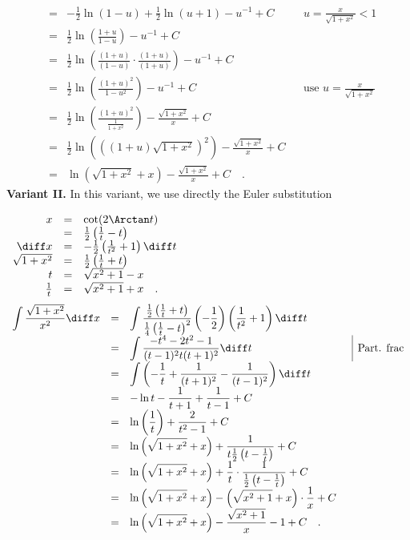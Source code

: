 {\[\begin{array}{rcll|l}
&=&\displaystyle  -\frac{1}{2} \ln{}\left(1-u\right)+ \frac{ 1}{2} \ln{}\left(u+1\right)- u^{-1}   +C&& u=\frac{x}{\sqrt{1+x^2}}<1\\
&=&\displaystyle \frac{1}{2} \ln\left(\frac{1+u}{1-u} \right) - u^{-1}+C  \\
&=&\displaystyle \frac{1}{2} \ln\left(\frac{(1+u)}{(1-u)} \cdot \frac{(1+u)}{(1+u)} \right) - u^{-1}+C  \\
&=&\displaystyle \frac{1}{2} \ln \left( \frac{(1+u)^2}{1-u^2 }\right) - u^{-1}+C&&\text{use }u=\frac{x}{\sqrt{1+x^2}}\\
&=&\displaystyle \frac{1}{2}\ln \left( \frac{ (1+u)^2 }{ \frac{ 1}{1+x^2}} \right)-\frac{\sqrt{1+x^2}}{x}+C\\
&=&\displaystyle \frac{1}{2} \ln \left( \left((1+ u) \sqrt{1 + x^2} \right)^2\right)-\frac{\sqrt{1+x^2}}{x}+C\\
&=&\displaystyle \ln \left(\sqrt{1+x^2}+x \right)-\frac{\sqrt{1+x^2}}{x}+C\quad .
\end{array}
\]
\textbf{Variant II. } In this variant, we use directly the Euler substitution 

$\begin{array}{rcl}
x&=&\cot (2\Arctan t)\\
&=& \frac{1 }{2} \left( \frac{ 1}{t}-t\right)\\ 
\diff x &=&-\frac{1}{2}\left(\frac{1}{t^2}+1\right) \diff t \\
\sqrt{1+x^2}&=&\frac{1}{2}\left(\frac{1}{t}+t\right)\\
t&=&\sqrt{x^2+1}-x\\
\frac{1}{t}&=&\sqrt{x^2+1}+x\quad .
\end{array}
$
\[
\begin{array}{rcll|l}
\displaystyle \int \frac{\sqrt{1+x^2}}{x^2}\diff x&=&\displaystyle \int \frac{ \frac{1}{2} \left( \frac{1}{t}+t\right) }{\frac{1}{4}\left(\frac{1}{t}-t\right)^2} \left(-\frac{1}{2} \right)\left( \frac{1}{t^2}+1\right) \diff t\\
&=&\displaystyle  \int \frac{-t^{4}-2t^{2}-1}{(t-1)^2t(t+1)^2 }\diff t&&\text{Part. frac}\\
&=&\displaystyle \int\left(-\frac{1}{t }+\frac{1}{(t +1)^{2}}-\frac{1}{(t -1)^{2}}\right)\diff t\\
&=&\displaystyle - \ln{}t - \frac{1}{t+1}+\frac{1}{t-1}+C\\
&=&\displaystyle \ln \left(\frac{1}{t} \right) +\frac{2}{t^2-1} +C\\
&=&\displaystyle \ln \left(\sqrt{1+x^2}+x \right)+ \frac{1}{t\frac{1 }{2} \left( t-\frac{1}{t}\right)}+C\\
&=&\displaystyle \ln \left(\sqrt{1+x^2}+x \right)+ \frac{1}{t}\cdot \frac{1}{\frac{1}{2}\left(t-\frac{1}{t}\right)}+C\\
&=&\displaystyle \ln \left(\sqrt{1+x^2}+x \right)- \left(\sqrt{x^2+1}+x\right)\cdot \frac{1}{x}+C\\
&=&\displaystyle \ln \left(\sqrt{1+x^2}+x \right)- \frac{\sqrt{x^2+1}}{x}-1+C\quad .
\end{array}
\]
}